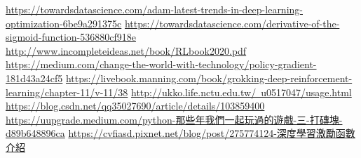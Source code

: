\renewcommand\bibname{\fontsize{0.00001pt}{3pt}\selectfont 參~考~文~獻}
\begin{thebibliography}{90} %
\begin{flushleft}
\end{flushleft}
\href{https://towardsdatascience.com/adam-latest-trends-in-deep-learning-optimization-6be9a291375c}{https://towardsdatascience.com/adam-latest-trends-in-deep-learning-optimization-6be9a291375c}
\href{https://towardsdatascience.com/derivative-of-the-sigmoid-function-536880cf918e}{https://towardsdatascience.com/derivative-of-the-sigmoid-function-536880cf918e}
\href{http://www.incompleteideas.net/book/RLbook2020.pdf}{http://www.incompleteideas.net/book/RLbook2020.pdf}
\href{https://medium.com/change-the-world-with-technology/policy-gradient-181d43a24cf5}{https://medium.com/change-the-world-with-technology/policy-gradient-181d43a24cf5}
\href{https://livebook.manning.com/book/grokking-deep-reinforcement-learning/chapter-11/v-11/38}{https://livebook.manning.com/book/grokking-deep-reinforcement-learning/chapter-11/v-11/38}
\href{http://ukko.life.nctu.edu.tw/~u0517047/usage.html}{http://ukko.life.nctu.edu.tw/~u0517047/usage.html}
\href{https://blog.csdn.net/qq_35027690/article/details/103859400}{https://blog.csdn.net/qq35027690/article/details/103859400}
\href{https://uupgrade.medium.com/python-那些年我們一起玩過的遊戲-三-打磚塊-d89b648896ca}{https://uupgrade.medium.com/python-那些年我們一起玩過的遊戲-三-打磚塊-d89b648896ca}
\href{https://cvfiasd.pixnet.net/blog/post/275774124-深度學習激勵函數介紹}{https://cvfiasd.pixnet.net/blog/post/275774124-深度學習激勵函數介紹}
\end{thebibliography}